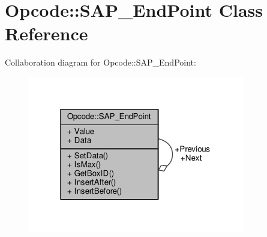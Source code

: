 \hypertarget{classOpcode_1_1SAP__EndPoint}{}\section{Opcode\+:\+:S\+A\+P\+\_\+\+End\+Point Class Reference}
\label{classOpcode_1_1SAP__EndPoint}


Collaboration diagram for Opcode\+:\+:S\+A\+P\+\_\+\+End\+Point\+:
\nopagebreak
\begin{figure}[H]
\begin{center}
\leavevmode
\includegraphics[width=268pt]{de/dc4/classOpcode_1_1SAP__EndPoint__coll__graph}
\end{center}
\end{figure}
